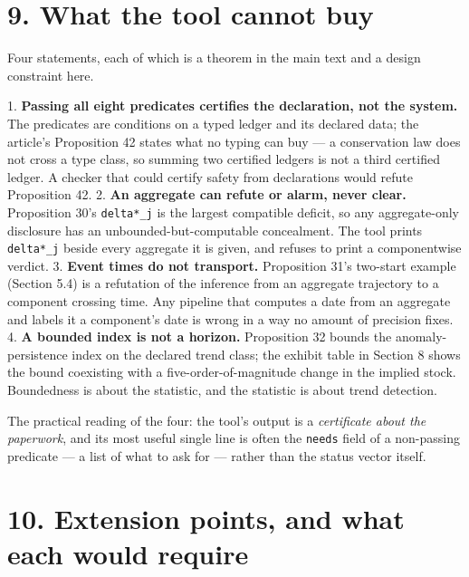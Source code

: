 \documentclass[11pt]{article}
\begin{document}
\vspace{0.8em}

\section*{9. What the tool cannot buy}\label{9-what-the-tool-cannot-buy}

Four statements, each of which is a theorem in the main text and a design constraint here.

1. \textbf{Passing all eight predicates certifies the declaration, not the system.} The predicates are conditions on a typed ledger and its declared data; the article's Proposition 42 states what no typing can buy --- a conservation law does not cross a type class, so summing two certified ledgers is not a third certified ledger. A checker that could certify safety from declarations would refute Proposition 42. 2. \textbf{An aggregate can refute or alarm, never clear.} Proposition 30's \texttt{delta*\_j} is the largest compatible deficit, so any aggregate-only disclosure has an unbounded-but-computable concealment. The tool prints \texttt{delta*\_j} beside every aggregate it is given, and refuses to print a componentwise verdict. 3. \textbf{Event times do not transport.} Proposition 31's two-start example (Section 5.4) is a refutation of the inference from an aggregate trajectory to a component crossing time. Any pipeline that computes a date from an aggregate and labels it a component's date is wrong in a way no amount of precision fixes. 4. \textbf{A bounded index is not a horizon.} Proposition 32 bounds the anomaly-persistence index on the declared trend class; the exhibit table in Section 8 shows the bound coexisting with a five-order-of-magnitude change in the implied stock. Boundedness is about the statistic, and the statistic is about trend detection.

The practical reading of the four: the tool's output is a \emph{certificate about the paperwork}, and its most useful single line is often the \texttt{needs} field of a non-passing predicate --- a list of what to ask for --- rather than the status vector itself.

\vspace{0.8em}

\section*{10. Extension points, and what each would require}\label{10-extension-points-and-what-each-would-require}
\end{document}
